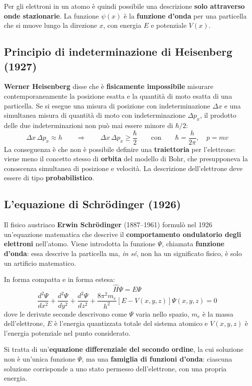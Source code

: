 \documentclass[11pt, a4paper, openright]{book}
\begin{document}
Per gli elettroni in un atomo è quindi possibile una descrizione \textbf{solo attraverso onde stazionarie}. La funzione $\psi(x)$ è la \textbf{funzione d'onda} per una particella che si muove lungo la direzione $x$, con energia $E$ e potenziale $V(x)$.

\newpage

\subsection{Principio di indeterminazione di Heisenberg (1927)}
\textbf{Werner Heisenberg} disse che è \textbf{fisicamente impossibile} misurare contemporaneamente la posizione esatta e la quantità di moto esatta di una particella. Se si esegue una misura di posizione con indeterminazione $\Delta x$ e una simultanea misura di quantità di moto con indeterminazione $\Delta p_x$, il prodotto delle due indeterminazioni non può mai essere minore di $\hbar/2$:
\[
\Delta x\, \Delta p_x \approx h
\qquad \Longrightarrow \qquad
\Delta x\, \Delta p_x \geq \frac{\hbar}{2}
\qquad\text{con}\qquad
\hbar = \frac{h}{2\pi}, \quad p = mv
\]
La conseguenza è che non è possibile definire una \textbf{traiettoria} per l'elettrone: viene meno il concetto stesso di \textbf{orbita} del modello di Bohr, che presupponeva la conoscenza simultanea di posizione e velocità. La descrizione dell'elettrone deve essere di tipo \textbf{probabilistico}.

\subsection{L'equazione di Schrödinger (1926)}
Il fisico austriaco \textbf{Erwin Schrödinger} (1887--1961) formulò nel 1926 un'equazione matematica che descrive il \textbf{comportamento ondulatorio degli elettroni} nell'atomo. Viene introdotta la funzione $\Psi$, chiamata \textbf{funzione d'onda}: essa descrive la particella ma, \emph{in sé}, non ha un significato fisico, è solo un artificio matematico.

In forma compatta e in forma estesa:
\[
\hat{H}\Psi = E\Psi
\]
\[
\frac{d^{2}\Psi}{dx^{2}} + \frac{d^{2}\Psi}{dy^{2}} + \frac{d^{2}\Psi}{dz^{2}}
+ \frac{8\pi^{2} m_{e}}{h^{2}}\left[E - V(x,y,z)\right]\Psi(x,y,z) = 0
\]
dove le derivate seconde descrivono come $\Psi$ varia nello spazio, $m_e$ è la massa dell'elettrone, $E$ è l'energia quantizzata totale del sistema atomico e $V(x,y,z)$ è l'energia potenziale nel punto considerato.

Si tratta di un'\textbf{equazione differenziale del secondo ordine}, la cui soluzione non è un'unica funzione $\Psi$, ma una \textbf{famiglia di funzioni d'onda}: ciascuna soluzione corrisponde a uno stato permesso dell'elettrone, con una propria energia.
\end{document}

